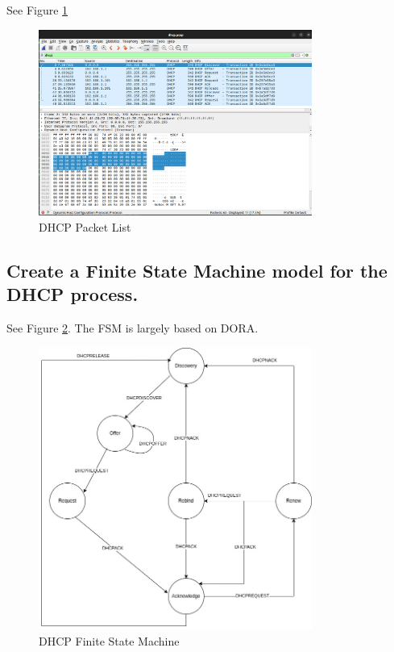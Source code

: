 \documentclass{article}
\begin{document}
See Figure \ref{fig:pcap_dhcp}

\begin{figure}[h]
    \centering
    \includegraphics[width=0.8\textwidth]{task2/dhcp_wireshark.png}
    \caption{DHCP Packet List}
    \label{fig:pcap_dhcp}
\end{figure}

\subsection{Create a Finite State Machine model for the DHCP process.}
 
See Figure \ref{fig:dhcp_fsm}. The FSM is largely based on DORA.

\begin{figure}[h]
    \centering
    \includegraphics[width=0.8\textwidth]{task2/DHCP_FSM.jpg}
    \caption{DHCP Finite State Machine}
    \label{fig:dhcp_fsm}
\end{figure}
\end{document}

